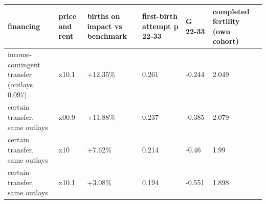 \begingroup\small
\setlength{\tabcolsep}{3pt}
\renewcommand{\arraystretch}{1.04}
\begin{tabularx}{\linewidth}{XXXXXX}
\toprule
financing & price and rent & births on impact vs benchmark & first-birth attempt p 22-33 & G 22-33 & completed fertility (own cohort) \\
\midrule
income-contingent transfer (outlays 0.097) & x10.1 & +12.35\% & 0.261 & -0.244 & 2.049 \\
certain transfer, same outlays & x00.9 & +11.88\% & 0.237 & -0.385 & 2.079 \\
certain transfer, same outlays & x10 & +7.62\% & 0.214 & -0.46 & 1.99 \\
certain transfer, same outlays & x10.1 & +3.08\% & 0.194 & -0.551 & 1.898 \\
\bottomrule
\end{tabularx}
\endgroup
